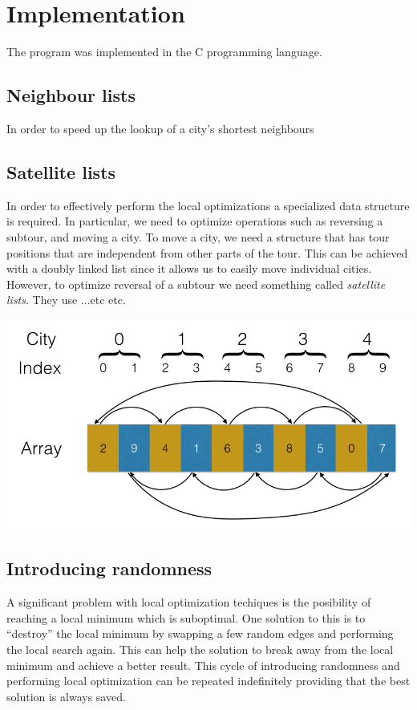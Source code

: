\documentclass[paper=a4, fontsize=11pt,numbers=endperiod]{scrartcl} %
\numberwithin{equation}{section} %
\numberwithin{figure}{section} %
\numberwithin{table}{section} %
\begin{document}
\section{Implementation}
The program was implemented in the C programming language.

\subsection{Neighbour lists}
In order to speed up the lookup of a city's shortest neighbours

\subsection{Satellite lists}
In order to effectively perform the local optimizations a specialized data structure is required. In particular, we need to optimize operations such as reversing a subtour, and moving a city. To move a city, we need a structure that has tour positions that are independent from other parts of the tour. This can be achieved with a doubly linked list since it allows us to easily move individual cities. However, to optimize reversal of a subtour we need something called \emph{satellite lists}. They use ...etc etc.

\begin{center}
\includegraphics[scale=0.3]{satellite}
\end{center}

\subsection{Introducing randomness}
A significant problem with local optimization techiques is the posibility of reaching a local minimum which is suboptimal.
One solution to this is to ``destroy'' the local minimum by swapping a few random edges and performing the local search again.
This can help the solution to break away from the local minimum and achieve a better result.
This cycle of introducing randomness and performing local optimization can be repeated indefinitely providing that the best solution is always saved.
\end{document}
